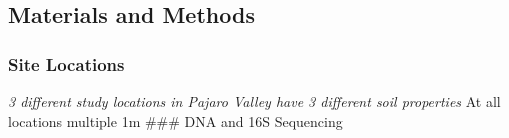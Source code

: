 \documentclass[
  12pt,
]{article}
\begin{document}
\hypertarget{materials-and-methods}{%
\subsection{Materials and Methods}\label{materials-and-methods}}

\hypertarget{site-locations}{%
\subsubsection{Site Locations}\label{site-locations}}

\emph{3 different study locations in Pajaro Valley have 3 different soil
properties } At all locations multiple 1m \#\#\# DNA and 16S Sequencing

\hypertarget{section}{%
\subsubsection{}\label{section}}
\end{document}
